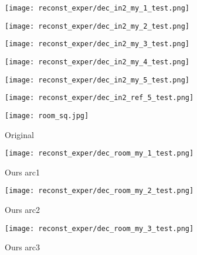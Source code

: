 \begin{figure}[H]
\begin{subfigure}[b]{0.13\linewidth}
	\end{subfigure}
	\begin{subfigure}[b]{0.13\linewidth}
		\texttt{[image: reconst\_exper/dec\_in2\_my\_1\_test.png]} %
	\end{subfigure}
	\begin{subfigure}[b]{0.13\linewidth}
		\texttt{[image: reconst\_exper/dec\_in2\_my\_2\_test.png]} %
	\end{subfigure}
	\begin{subfigure}[b]{0.13\linewidth}
		\texttt{[image: reconst\_exper/dec\_in2\_my\_3\_test.png]} %
	\end{subfigure}
	\begin{subfigure}[b]{0.13\linewidth}
		\texttt{[image: reconst\_exper/dec\_in2\_my\_4\_test.png]} %
	\end{subfigure}
	\begin{subfigure}[b]{0.13\linewidth}
		\texttt{[image: reconst\_exper/dec\_in2\_my\_5\_test.png]} %
	\end{subfigure}
	\begin{subfigure}[b]{0.13\linewidth}
		\texttt{[image: reconst\_exper/dec\_in2\_ref\_5\_test.png]} %
	\end{subfigure}
	\centering
	\begin{subfigure}[b]{0.13\linewidth}
		\texttt{[image: room\_sq.jpg]} %
		\caption{Original}
	\end{subfigure}
	\begin{subfigure}[b]{0.13\linewidth}
		\texttt{[image: reconst\_exper/dec\_room\_my\_1\_test.png]} %
		\caption{Ours arc1}
	\end{subfigure}
	\begin{subfigure}[b]{0.13\linewidth}
		\texttt{[image: reconst\_exper/dec\_room\_my\_2\_test.png]} %
		\caption{Ours arc2}
	\end{subfigure}
	\begin{subfigure}[b]{0.13\linewidth}
		\texttt{[image: reconst\_exper/dec\_room\_my\_3\_test.png]} %
		\caption{Ours arc3}
	\end{subfigure}
	\begin{subfigure}[b]{0.13\linewidth}

\end{subfigure}
\end{figure}
